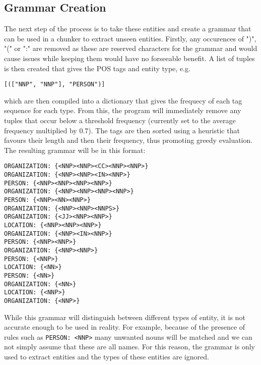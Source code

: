 \documentclass[draft]{article}
\begin{document}
\begin{multicols*}{2}
\section*{Grammar Creation}
The next step of the process is to take these entities and create a grammar that can be used in a chunker \citep{NLPChunker} to extract unseen entities. Firstly, any occurences of ")", "(" or ":" are removed as these are reserved characters for the grammar and would cause issues while keeping them would have no forseeable benefit. A list of tuples is then created that gives the POS tags and entity type, e.g. \begin{verbatim}[(["NNP", "NNP"], "PERSON")]\end{verbatim} which are then compiled into a dictionary that gives the frequecy of each tag sequence for each type. From this, the program will immediately remove any tuples that occur below a threshold frequency (currently set to the average frequency multiplied by 0.7). The tags are then sorted using a heuristic that favours their length and then their frequency, thus promoting greedy evaluation. The resulting grammar will be in this format:
\begin{verbatim}
ORGANIZATION: {<NNP><NNP><CC><NNP><NNP>}
ORGANIZATION: {<NNP><NNP><IN><NNP>}
PERSON: {<NNP><NNP><NNP><NNP>}
ORGANIZATION: {<NNP><NNP><NNP><NNP>}
PERSON: {<NNP><NN><NNP>}
ORGANIZATION: {<NNP><NNP><NNPS>}
ORGANIZATION: {<JJ><NNP><NNP>}
LOCATION: {<NNP><NNP><NNP>}
ORGANIZATION: {<NNP><IN><NNP>}
PERSON: {<NNP><NNP>}
ORGANIZATION: {<NNP><NNP>}
PERSON: {<NNP>}
LOCATION: {<NN>}
PERSON: {<NN>}
ORGANIZATION: {<NN>}
LOCATION: {<NNP>}
ORGANIZATION: {<NNP>}
\end{verbatim}

While this grammar will distinguish between different types of entity, it is not accurate enough to be used in reality. For example, because of the presence of rules such as \texttt{PERSON: {<NNP>}} many unwanted nouns will be matched and we can not simply assume that these are all names. For this reason, the grammar is only used to extract entities and the types of these entities are ignored.


\end{multicols*}
\end{document}
